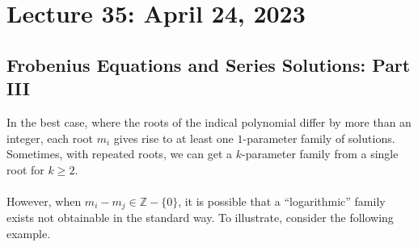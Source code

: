 \pagebreak

\section{Lecture 35: April 24, 2023}

    \subsection{Frobenius Equations and Series Solutions: Part III}

        In the best case, where the roots of the indical polynomial differ by more than an integer, each root \(m_i\) gives rise to at least one \(1\)-parameter family of solutions. Sometimes, with repeated roots, we can get a \(k\)-parameter family from a single root for \(k\geq 2\).
        \\
        \\
        However, when \(m_i-m_j\in\mathbb{Z}-\{0\}\), it is possible that a ``logarithmic'' family exists not obtainable in the standard way. To illustrate, consider the following example.
